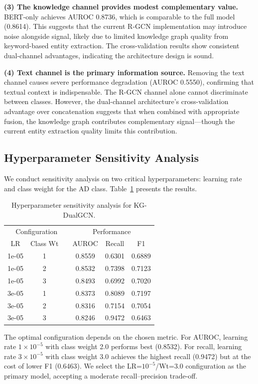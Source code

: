 \documentclass[11pt,onecolumn,a4paper]{article}
\begin{document}
\textbf{(3) The knowledge channel provides modest complementary value.} BERT-only achieves AUROC 0.8736, which is comparable to the full model (0.8614). This suggests that the current R-GCN implementation may introduce noise alongside signal, likely due to limited knowledge graph quality from keyword-based entity extraction. The cross-validation results show consistent dual-channel advantages, indicating the architecture design is sound.

\textbf{(4) Text channel is the primary information source.} Removing the text channel causes severe performance degradation (AUROC 0.5550), confirming that textual context is indispensable. The R-GCN channel alone cannot discriminate between classes. However, the dual-channel architecture's cross-validation advantage over concatenation suggests that when combined with appropriate fusion, the knowledge graph contributes complementary signal---though the current entity extraction quality limits this contribution.

\subsection{Hyperparameter Sensitivity Analysis}

We conduct sensitivity analysis on two critical hyperparameters: learning rate and class weight for the AD class. Table~\ref{tab:sensitivity} presents the results.

\begin{table}[H]
\centering
\caption{Hyperparameter sensitivity analysis for KG-DualGCN.}
\label{tab:sensitivity}
\begin{tabular}{ccc|ccc}
\toprule
\multicolumn{3}{c|}{Configuration} & \multicolumn{3}{c}{Performance} \\
LR & Class Wt & & AUROC & Recall & F1 \\
\midrule
1e-05 & 1 & & 0.8559 & 0.6301 & 0.6889 \\
1e-05 & 2 & & 0.8532 & 0.7398 & 0.7123 \\
1e-05 & 3 & & 0.8493 & 0.6992 & 0.7020 \\
3e-05 & 1 & & 0.8373 & 0.8089 & 0.7197 \\
3e-05 & 2 & & 0.8316 & 0.7154 & 0.7054 \\
3e-05 & 3 & & 0.8246 & 0.9472 & 0.6463 \\
\bottomrule
\end{tabular}
\end{table}

The optimal configuration depends on the chosen metric. For AUROC, learning rate $1 \times 10^{-5}$ with class weight 2.0 performs best (0.8532). For recall, learning rate $3 \times 10^{-5}$ with class weight 3.0 achieves the highest recall (0.9472) but at the cost of lower F1 (0.6463). We select the LR=$10^{-5}$/Wt=3.0 configuration as the primary model, accepting a moderate recall--precision trade-off.
\end{document}
